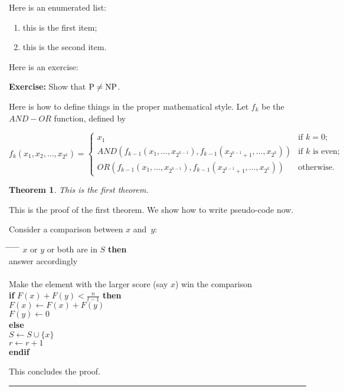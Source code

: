 \documentclass[twoside]{article}
\newcounter{lecnum}
\newtheorem{theorem}{Theorem}[lecnum]
\newenvironment{proof}{{\bf Proof:}}{\hfill\rule{2mm}{2mm}}
\begin{document}
Here is an enumerated list:
\begin{enumerate}
\item this is the first item;
\item this is the second item.
\end{enumerate}

Here is an exercise:

{\bf Exercise:}  Show that ${\rm P}\ne{\rm NP}$.

Here is how to define things in the proper mathematical style.
Let $f_k$ be the $AND-OR$ function, defined by

\[ f_k(x_1, x_2, \ldots, x_{2^k}) = \left\{ \begin{array}{ll}

	x_1 & \mbox{if $k = 0$;} \\

	AND(f_{k-1}(x_1, \ldots, x_{2^{k-1}}),
	   f_{k-1}(x_{2^{k-1} + 1}, \ldots, x_{2^k}))
	 & \mbox{if $k$ is even;} \\

	OR(f_{k-1}(x_1, \ldots, x_{2^{k-1}}),
	   f_{k-1}(x_{2^{k-1} + 1}, \ldots, x_{2^k}))	
	& \mbox{otherwise.} 
	\end{array}
	\right. \]

\begin{theorem}
This is the first theorem.
\end{theorem}

\begin{proof}
This is the proof of the first theorem. We show how to write pseudo-code now.

Consider a comparison between $x$ and~$y$:
\begin{tabbing}
\hspace*{.25in} \= \hspace*{.25in} \= \hspace*{.25in} \= \hspace*{.25in} \= \hspace*{.25in} \=\kill
{} $x$ or $y$ or both are in $S$ {\bf then } \\
\>\> answer accordingly \\
 \\
\>\>    Make the element with the larger score (say $x$) win the comparison \\
\>\> {\bf if} $F(x) + F(y) < \frac{n}{t-1}$ {\bf then} \\%
\>\>\> $F(x) \leftarrow F(x) + F(y)$ \\
\>\>\> $F(y) \leftarrow 0$ \\
\>\> {\bf else}  \\
\>\>\> $S \leftarrow S \cup \{ x \} $ \\
\>\>\> $r \leftarrow r+1$ \\
\>\> {\bf endif} \\
\end{tabbing}

This concludes the proof.
\end{proof}
\end{document}
